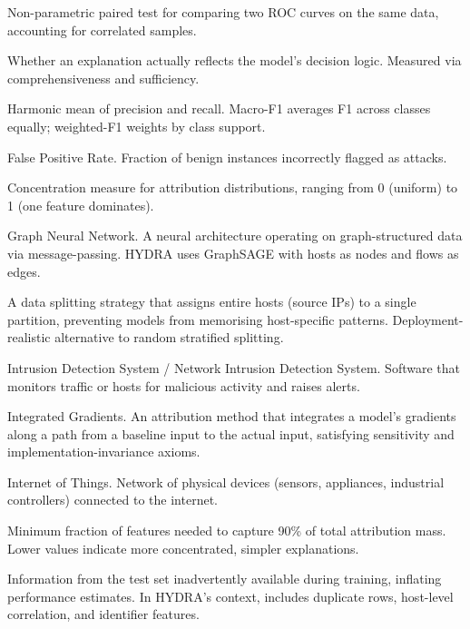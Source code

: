 \documentclass[12pt,a4paper]{report}
\begin{document}
\begin{description}[leftmargin=2.8cm,style=nextline,itemsep=0.2em]
\item[DeLong test] Non-parametric paired test for comparing two ROC curves on the same data, accounting for correlated samples.

\item[Faithfulness] Whether an explanation actually reflects the model's decision logic. Measured via comprehensiveness and sufficiency.

\item[F1] Harmonic mean of precision and recall. Macro-F1 averages F1 across classes equally; weighted-F1 weights by class support.

\item[FPR] False Positive Rate. Fraction of benign instances incorrectly flagged as attacks.

\item[Gini coefficient] Concentration measure for attribution distributions, ranging from 0 (uniform) to 1 (one feature dominates).

\item[GNN] Graph Neural Network. A neural architecture operating on graph-structured data via message-passing. HYDRA uses GraphSAGE with hosts as nodes and flows as edges.

\item[Host-disjoint split] A data splitting strategy that assigns entire hosts (source IPs) to a single partition, preventing models from memorising host-specific patterns. Deployment-realistic alternative to random stratified splitting.

\item[IDS / NIDS] Intrusion Detection System / Network Intrusion Detection System. Software that monitors traffic or hosts for malicious activity and raises alerts.

\item[IG] Integrated Gradients. An attribution method that integrates a model's gradients along a path from a baseline input to the actual input, satisfying sensitivity and implementation-invariance axioms.

\item[IoT] Internet of Things. Network of physical devices (sensors, appliances, industrial controllers) connected to the internet.

\item[$k_{90}$] Minimum fraction of features needed to capture 90\% of total attribution mass. Lower values indicate more concentrated, simpler explanations.

\item[Leakage] Information from the test set inadvertently available during training, inflating performance estimates. In HYDRA's context, includes duplicate rows, host-level correlation, and identifier features.


\end{description}
\end{document}
